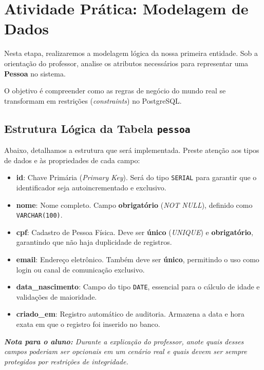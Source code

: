\documentclass[12pt,a4paper,openright]{book}
\begin{document}
\section{Atividade Prática: Modelagem de Dados}

\begin{tcolorbox}[colback=green!5,colframe=green!40!black,title=Exercício Dirigido com o Professor]
Nesta etapa, realizaremos a modelagem lógica da nossa primeira entidade. Sob a orientação do professor, analise os atributos necessários para representar uma \textbf{Pessoa} no sistema. 

O objetivo é compreender como as regras de negócio do mundo real se transformam em restrições (\textit{constraints}) no PostgreSQL.
\end{tcolorbox}

\subsection{Estrutura Lógica da Tabela \texttt{pessoa}}

Abaixo, detalhamos a estrutura que será implementada. Preste atenção aos tipos de dados e às propriedades de cada campo:

\begin{itemize}
    \item \textbf{id}: Chave Primária (\textit{Primary Key}). Será do tipo \texttt{SERIAL} para garantir que o identificador seja autoincrementado e exclusivo.
    \item \textbf{nome}: Nome completo. Campo \textbf{obrigatório} (\textit{NOT NULL}), definido como \texttt{VARCHAR(100)}.
    \item \textbf{cpf}: Cadastro de Pessoa Física. Deve ser \textbf{único} (\textit{UNIQUE}) e \textbf{obrigatório}, garantindo que não haja duplicidade de registros.
    \item \textbf{email}: Endereço eletrônico. Também deve ser \textbf{único}, permitindo o uso como login ou canal de comunicação exclusivo.
    \item \textbf{data\_nascimento}: Campo do tipo \texttt{DATE}, essencial para o cálculo de idade e validações de maioridade.
    \item \textbf{criado\_em}: Registro automático de auditoria. Armazena a data e hora exata em que o registro foi inserido no banco.
\end{itemize}



\vspace{0.5cm}
\begin{center}
\textit{\textbf{Nota para o aluno:} Durante a explicação do professor, anote quais desses campos poderiam ser opcionais em um cenário real e quais devem ser sempre protegidos por restrições de integridade.}
\end{center}
\end{document}
